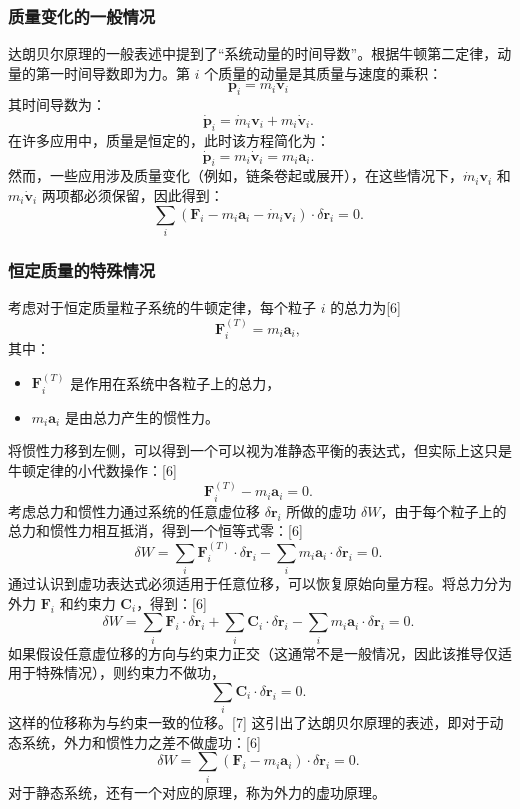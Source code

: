 \subsubsection{质量变化的一般情况}

达朗贝尔原理的一般表述中提到了“系统动量的时间导数”。根据牛顿第二定律，动量的第一时间导数即为力。第 \( i \) 个质量的动量是其质量与速度的乘积：
\[
\mathbf{p}_i = m_i \mathbf{v}_i~
\]
其时间导数为：
\[
\dot{\mathbf{p}}_i = \dot{m}_i \mathbf{v}_i + m_i \dot{\mathbf{v}}_i.~
\]
在许多应用中，质量是恒定的，此时该方程简化为：
\[
\dot{\mathbf{p}}_i = m_i \dot{\mathbf{v}}_i = m_i \mathbf{a}_i.~
\]
然而，一些应用涉及质量变化（例如，链条卷起或展开），在这些情况下，\(\dot{m}_i \mathbf{v}_i\) 和 \(m_i \dot{\mathbf{v}}_i\) 两项都必须保留，因此得到：
\[
\sum_{i} \left( \mathbf{F}_i - m_i \mathbf{a}_i - \dot{m}_i \mathbf{v}_i \right) \cdot \delta \mathbf{r}_i = 0.~
\]
\subsubsection{恒定质量的特殊情况}

考虑对于恒定质量粒子系统的牛顿定律，每个粒子 \( i \) 的总力为[6]
\[
\mathbf{F}_i^{(T)} = m_i \mathbf{a}_i,~
\]
其中：
\begin{itemize}
\item \( \mathbf{F}_i^{(T)} \) 是作用在系统中各粒子上的总力，
\item \( m_i \mathbf{a}_i \) 是由总力产生的惯性力。
\end{itemize}
将惯性力移到左侧，可以得到一个可以视为准静态平衡的表达式，但实际上这只是牛顿定律的小代数操作：[6]
\[
\mathbf{F}_i^{(T)} - m_i \mathbf{a}_i = 0.~
\]
考虑总力和惯性力通过系统的任意虚位移 \( \delta \mathbf{r}_i \) 所做的虚功 \( \delta W \)，由于每个粒子上的总力和惯性力相互抵消，得到一个恒等式零：[6]
\[
\delta W = \sum_i \mathbf{F}_i^{(T)} \cdot \delta \mathbf{r}_i - \sum_i m_i \mathbf{a}_i \cdot \delta \mathbf{r}_i = 0.~
\]
通过认识到虚功表达式必须适用于任意位移，可以恢复原始向量方程。将总力分为外力 \( \mathbf{F}_i \) 和约束力 \( \mathbf{C}_i \)，得到：[6]
\[
\delta W = \sum_i \mathbf{F}_i \cdot \delta \mathbf{r}_i + \sum_i \mathbf{C}_i \cdot \delta \mathbf{r}_i - \sum_i m_i \mathbf{a}_i \cdot \delta \mathbf{r}_i = 0.~
\]
如果假设任意虚位移的方向与约束力正交（这通常不是一般情况，因此该推导仅适用于特殊情况），则约束力不做功，
\[
\sum_i \mathbf{C}_i \cdot \delta \mathbf{r}_i = 0.~
\]
这样的位移称为与约束一致的位移。[7] 这引出了达朗贝尔原理的表述，即对于动态系统，外力和惯性力之差不做虚功：[6]
\[
\delta W = \sum_i (\mathbf{F}_i - m_i \mathbf{a}_i) \cdot \delta \mathbf{r}_i = 0.~
\]
对于静态系统，还有一个对应的原理，称为外力的虚功原理。